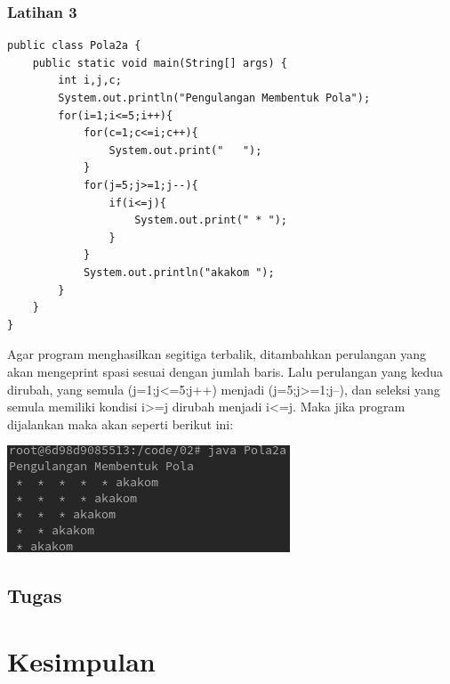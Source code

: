 \documentclass[a4paper,12pt]{article}
\begin{document}
\subsubsection{Latihan 3}
\begin{center}
    \begin{lstlisting}
public class Pola2a {
    public static void main(String[] args) {
        int i,j,c;
        System.out.println("Pengulangan Membentuk Pola");
        for(i=1;i<=5;i++){
            for(c=1;c<=i;c++){
                System.out.print("   ");
            }
            for(j=5;j>=1;j--){
                if(i<=j){
                    System.out.print(" * ");
                }
            }
            System.out.println("akakom ");
        }
    }
}
    \end{lstlisting}
\end{center}
Agar program menghasilkan segitiga terbalik, ditambahkan perulangan yang akan mengeprint spasi sesuai dengan jumlah baris. Lalu perulangan yang kedua dirubah, yang semula (j=1;j<=5;j++) 
menjadi (j=5;j>=1;j--), dan seleksi yang semula memiliki kondisi i>=j dirubah menjadi i<=j. Maka jika program dijalankan maka akan seperti berikut ini:\\
\begin{center}
    \includegraphics[scale=.7]{13.png}
\end{center}

\newpage

\subsection{Tugas}


\newpage
\section{Kesimpulan}
\end{document}
